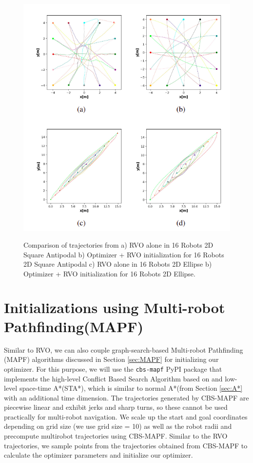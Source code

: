 \begin{figure}[H]
    \centering
    {\includegraphics[scale=0.6]{figures/appendix/RVO_inits.png}} 
    \caption[Appendix: Trajectories using RVO + multirobot optimizer]{Comparison of trajectories from a) RVO alone in 16 Robots 2D Square Antipodal b) Optimizer + RVO initialization for 16 Robots 2D Square Antipodal c) RVO alone in 16 Robots 2D Ellipse b) Optimizer + RVO initialization for 16 Robots 2D Ellipse.}
    \label{fig:RVO+opti_2D}
\end{figure}

\section{Initializations using Multi-robot Pathfinding(MAPF)\cite{sharon_journal}}\label{sec:appendix-MAPF}

Similar to RVO, we can also couple graph-search-based Multi-robot Pathfinding (MAPF) algorithms discussed in Section \ref{sec:MAPF} for initializing our optimizer. For this purpose, we will use the \texttt{cbs-mapf} PyPI package that implements the high-level Conflict Based Search Algorithm based on \cite{sharon_journal} and low-level space-time A*(STA*), which is similar to normal A*(from Section \ref{sec:A*} with an additional time dimension. The trajectories generated by CBS-MAPF are piecewise linear and exhibit jerks and sharp turns, so these cannot be used practically for multi-robot navigation. We scale up the start and goal coordinates depending on grid size (we use grid size = 10) as well as the robot radii and precompute multirobot trajectories using CBS-MAPF. Similar to the RVO trajectories, we sample points from the trajectories obtained from CBS-MAPF to calculate the optimizer parameters and initialize our optimizer. 

